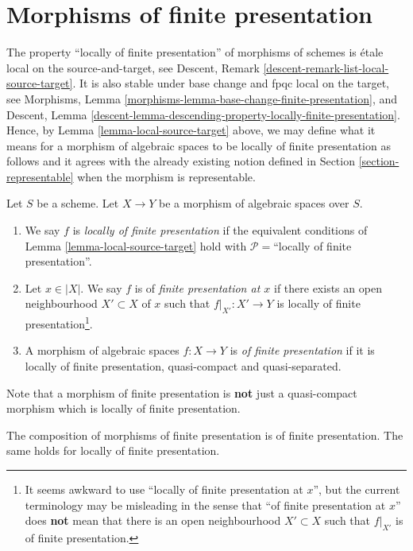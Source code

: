 \section{Morphisms of finite presentation}
\label{section-finite-presentation}

\noindent
The property ``locally of finite presentation'' of morphisms of schemes is
\'etale local on the source-and-target, see
Descent, Remark \ref{descent-remark-list-local-source-target}.
It is also stable under base change and fpqc local on the target, see
Morphisms, Lemma \ref{morphisms-lemma-base-change-finite-presentation}, and
Descent,
Lemma \ref{descent-lemma-descending-property-locally-finite-presentation}.
Hence, by
Lemma \ref{lemma-local-source-target}
above, we may define what it means for a morphism of algebraic spaces
to be locally of finite presentation as
follows and it agrees with the already existing notion defined in
Section \ref{section-representable}
when the morphism is representable.

\begin{definition}
\label{definition-locally-finite-presentation}
Let $S$ be a scheme.
Let $X \to Y$ be a morphism of algebraic spaces over $S$.
\begin{enumerate}
\item We say $f$ is {\it locally of finite presentation} if
the equivalent conditions of
Lemma \ref{lemma-local-source-target}
hold with $\mathcal{P} =$``locally of finite presentation''.
\item Let $x \in |X|$. We say $f$ is of {\it finite presentation at $x$}
if there exists an open neighbourhood $X' \subset X$ of $x$ such
that $f|_{X'} : X' \to Y$ is locally of finite
presentation\footnote{It seems awkward to use ``locally of finite presentation
at $x$'', but the current terminology may be misleading in the sense that
``of finite presentation at $x$'' does {\bf not} mean that there is
an open neighbourhood $X' \subset X$ such that $f|_{X'}$ is of finite
presentation.}.
\item A morphism of algebraic spaces $f : X \to Y$ is
{\it of finite presentation}
if it is locally of finite presentation, quasi-compact and
quasi-separated.
\end{enumerate}
\end{definition}

\noindent
Note that a morphism of finite presentation is {\bf not} just a quasi-compact
morphism which is locally of finite presentation.

\begin{lemma}
\label{lemma-composition-finite-presentation}
The composition of morphisms of finite presentation is of finite presentation.
The same holds for locally of finite presentation.
\end{lemma}

